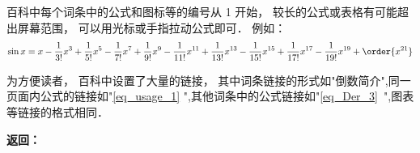 
\begin{issues}
\issueDraft
\end{issues}

百科中每个词条中的公式和图标等的编号从 1 开始， 较长的公式或表格有可能超出屏幕范围， 可以用光标或手指拉动公式即可． 例如：
\begin{equation}\label{eq_usage_1}
\sin x = x - \frac{1}{3!} x^3 + \frac{1}{5!} x^5 - \frac{1}{7!} x^7+\frac{1}{9!} x^9-\frac{1}{11!} x^{11}+\frac{1}{13!} x^{13}-\frac{1}{15!} x^{15}+\frac{1}{17!} x^{17}-\frac{1}{19!} x^{19}+ \order{x^{21}}
\end{equation}

为方便读者， 百科中设置了大量的链接， 其中词条链接的形式如"倒数简介",同一页面内公式的链接如"\autoref{eq_usage_1} ",其他词条中的公式链接如"\autoref{eq_Der_3}~",图表等链接的格式相同．

\textbf{返回：}